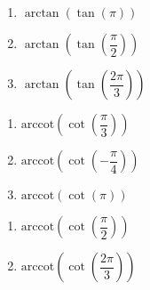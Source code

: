\documentclass{ximera}
\begin{document}
\begin{multicols}{3}

\begin{enumerate}

\setcounter{enumi}{\value{HW}}

\item  $\arctan\left(\tan\left(\pi\right) \right)$  
\item  $\arctan\left(\tan\left(\dfrac{\pi}{2}\right) \right)$  
\item  $\arctan\left(\tan\left(\dfrac{2\pi}{3}\right) \right)$

\setcounter{HW}{\value{enumi}}

\end{enumerate}

\end{multicols}

\begin{multicols}{3}

\begin{enumerate}

\setcounter{enumi}{\value{HW}}

\item  $\text{arccot}\left(\cot\left(\dfrac{\pi}{3}\right) \right)$ 
\item  $\text{arccot}\left(\cot\left(-\dfrac{\pi}{4}\right) \right)$
\item  $\text{arccot}\left(\cot\left(\pi\right) \right)$  

\setcounter{HW}{\value{enumi}}

\end{enumerate}

\end{multicols}

\begin{multicols}{3}

\begin{enumerate}

\setcounter{enumi}{\value{HW}}

\item  $\text{arccot}\left(\cot\left(\dfrac{\pi}{2}\right) \right)$  
\item  $\text{arccot}\left(\cot\left(\dfrac{2\pi}{3}\right) \right)$ \label{morecomboexactlast}

\setcounter{HW}{\value{enumi}}

\end{enumerate}

\end{multicols}
\end{document}
